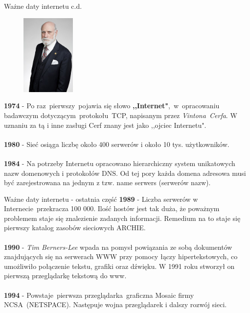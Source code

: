 \documentclass{beamer}
\begin{document}
	\begin{frame}{Ważne daty internetu c.d.}
		\begin{figure}
			\flushright
			\vspace{-30pt}
			\includegraphics[height=4cm]{cerf.jpg}
		\end{figure}
		\textbf{1974} - Po raz~pierwszy~pojawia się słowo \textbf{,,Internet"},~w~opracowaniu badawczym dotyczącym~protokołu~TCP, napisanym przez \emph{ Vintona~Cerfa}. W uznaniu za tą i inne zasługi Cerf znany jest jako ,,ojciec Internetu". \\ ~ \\
		\textbf{1980} - Sieć osiąga liczbę około 400 serwerów i około 10 tys. użytkowników. \\ ~ \\
		\textbf{1984} - Na potrzeby Internetu opracowano hierarchiczny system unikatowych nazw domenowych i protokołów DNS. Od tej pory każda domena adresowa musi być zarejestrowana na jednym z tzw. name serwers (serwerów nazw).
	\end{frame}
	\begin{frame}{Ważne daty internetu - ostatnia część}
		\textbf{1989} - Liczba serwerów w Internecie~przekracza 100 000. Ilość hostów jest tak duża, że poważnym problemem staje się znalezienie zadanych informacji. Remedium na to staje się pierwszy katalog zasobów sieciowych ARCHIE. \\ ~ \\
		\textbf{1990} - \emph{Tim Berners-Lee} wpada na pomysł powiązania ze sobą dokumentów znajdujących się na serwerach WWW przy pomocy łączy hipertekstowych, co umożliwiło połączenie tekstu, grafiki oraz dźwięku. W 1991 roku stworzył on pierwszą przeglądarkę tekstową do www. \\ ~ \\
		\textbf{1994} - Powstaje~pierwsza przeglądarka~graficzna Mosaic firmy NCSA~(NETSPACE). Następuje wojna przeglądarek i dalszy rozwój sieci.
	\end{frame}
\end{document}
